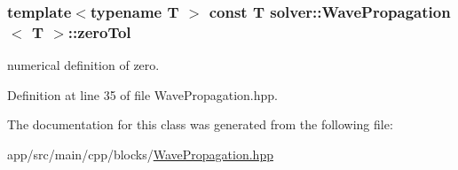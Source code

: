 \subsubsection[{\texorpdfstring{zero\+Tol}{zeroTol}}]{\setlength{\rightskip}{0pt plus 5cm}template$<$typename T $>$ const T {\bf solver\+::\+Wave\+Propagation}$<$ T $>$\+::zero\+Tol\hspace{0.3cm}{\ttfamily [protected]}}\hypertarget{classsolver_1_1WavePropagation_ad49670e8fd53ef1ace084b618a0d9a02}{}\label{classsolver_1_1WavePropagation_ad49670e8fd53ef1ace084b618a0d9a02}


numerical definition of zero. 



Definition at line 35 of file Wave\+Propagation.\+hpp.



The documentation for this class was generated from the following file\+:\begin{DoxyCompactItemize}
\item 
app/src/main/cpp/blocks/\hyperlink{WavePropagation_8hpp}{Wave\+Propagation.\+hpp}\end{DoxyCompactItemize}
